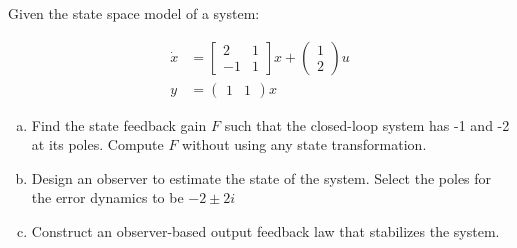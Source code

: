 \documentclass[11pt]{article}
\begin{document}
Given the state space model of a system:

\begin{align*}
    \dot{x} &= \begin{bmatrix}
        2 & 1 \\ -1 & 1
    \end{bmatrix} x + \begin{pmatrix}
        1 \\ 2
    \end{pmatrix} u \\
    y &= \begin{pmatrix}
        1 & 1
    \end{pmatrix} x
\end{align*}

\begin{enumerate}[a)]
    \item Find the state feedback gain $F$ such that the closed-loop system has -1 and -2 at its poles.
    Compute $F$ without using any state transformation.
    \item Design an observer to estimate the state of the system. Select the poles for the error dynamics to be $-2 \pm 2i$
    \item Construct an observer-based output feedback law that stabilizes the system.
\end{enumerate}
\soln
\end{document}
